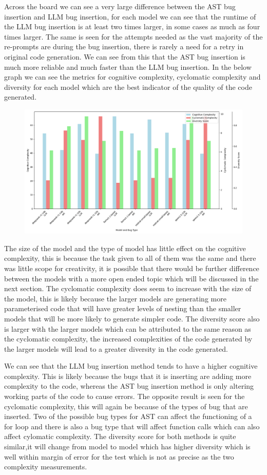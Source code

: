 \documentclass[12pt]{extarticle}
\begin{document}
Across the board we can see a very large difference between the AST bug insertion and LLM bug insertion, for each model we can see that the runtime of the LLM bug insertion is at least two times larger, in some cases as much as four times larger. The same is seen for the attempts needed as the vast majority of the re-prompts are during the bug insertion, there is rarely a need for a retry in original code generation. We can see from this that the AST bug insertion is much more reliable and much faster than the LLM bug insertion. In the below graph we can see the metrics for cognitive complexity, cyclomatic complexity and diversity for each model which are the best indicator of the quality of the code generated.

\begin{figure}[H]
\centering
\includegraphics[width=0.7\linewidth]{Images/Complexity_Comparison_Fibbonaci.png}
\label{fig:Complexity_Benchmark}
\end{figure}

The size of the model and the type of model has little effect on the cognitive complexity, this is because the task given to all of them was the same and there was little scope for creativity, it is possible that there would be further difference between the models with a more open ended topic which will be discussed in the next section. The cyclomatic complexity does seem to increase with the size of the model, this is likely because the larger models are generating more parameterised code that will have greater levels of nesting than the smaller models that will be more likely to generate simpler code. The diversity score also is larger with the larger models which can be attributed to the same reason as the cyclomatic complexity, the increased complexities of the code generated by the larger models will lead to a greater diversity in the code generated.

We can see that the LLM bug insertion method tends to have a higher cognitive complexity. This is likely because the bugs that it is inserting are adding more complexity to the code, whereas the AST bug insertion method is only altering working parts of the code to cause errors. The opposite result is seen for the cyclomatic complexity, this will again be because of the types of bug that are inserted. Two of the possible bug types for AST can affect the functioning of a for loop and there is also a bug type that will affect function calls which can also affect cylomatic complexity. The diversity score for both methods is quite similar,it will change from model to model which has higher diversity which is well within margin of error for the test which is not as precise as the two complexity measurements.
\end{document}
